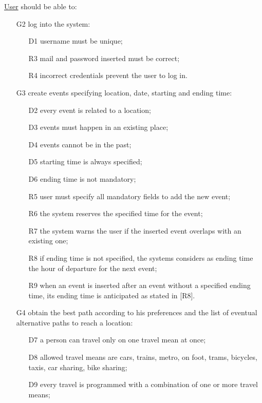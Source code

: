 \noindent\underline{User} should be able to:
\begin{itemize}
\item[G2] log into the system:
	\begin{itemize}
	\item[D1] username must be unique;
	\newline
	\item[R3] mail and password inserted must be correct;
	\item[R4] incorrect credentials prevent the user to log in.
	\end{itemize}
\item[G3] create events specifying location, date, starting and ending time:
	\begin{itemize}
	\item[D2] every event is related to a location;
	\item[D3] events must happen in an existing place;
	\item[D4] events cannot be in the past;
	\item[D5] starting time is always specified;
	\item[D6] ending time is not mandatory;
	\newline
	\item[R5] user must specify all mandatory fields to add the new event;
	\item[R6] the system reserves the specified time for the event;
	\item[R7] the system warns the user if the inserted event overlaps with an existing one;
	\item[R8] if ending time is not specified, the systems considers as ending time the hour of departure for the next event;
	\item[R9] when an event is inserted after an event without a specified ending time, its ending time is anticipated as stated in [R8].
	\end{itemize}
\item[G4] obtain the best path according to his preferences and the list of eventual alternative paths to reach a location:
	\begin{itemize}
	\item[D7] a person can travel only on one travel mean at once; 
	\item[D8] allowed travel means are cars, trains, metro, on foot, trams, bicycles, taxis, car sharing, bike sharing;
	\item[D9] every travel is programmed with a combination of one or more travel means;

\end{itemize}
\end{itemize}
